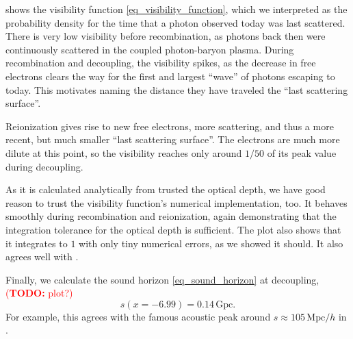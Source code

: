\documentclass[10pt,a4paper]{article}
\newcommand\TODO[1]{\textcolor{red}{(\textbf{TODO:} #1)}}
\begin{document}
 shows the visibility function \eqref{eq_visibility_function},
which we interpreted as the probability density for the time that a photon observed today was last scattered.
There is very low visibility before recombination, as photons back then were continuously scattered in the coupled photon-baryon plasma.
During recombination and decoupling, the visibility spikes, as the decrease in free electrons clears the way for the first and largest ``wave'' of photons escaping to today.
This motivates naming the distance they have traveled the ``last scattering surface''.

Reionization gives rise to new free electrons, more scattering, and thus a more recent, but much smaller ``last scattering surface''.
The electrons are much more dilute at this point, so the visibility reaches only around $1/50$ of its peak value during decoupling.

As it is calculated analytically from trusted the optical depth, we have good reason to trust the visibility function's numerical implementation, too.
It behaves smoothly during recombination and reionization, again demonstrating that the integration tolerance for the optical depth is sufficient.
The plot also shows that it integrates to $1$ with only tiny numerical errors, as we showed it should.
It also agrees well with \cite[\textsc{fig. 3}]{callinHowCalculateCMB2006}.

Finally, we calculate the sound horizon \eqref{eq_sound_horizon} at decoupling,
\TODO{plot?}
\begin{equation}
	s(x=-6.99) = 0.14\,\mathrm{Gpc}.
\end{equation}
For example, this agrees with the famous acoustic peak around $s \approx 105\,\mathrm{Mpc}/h$ in \cite[\textsc{Fig. 2}]{eisensteinDetectionBaryonAcoustic2005}.
\end{document}
